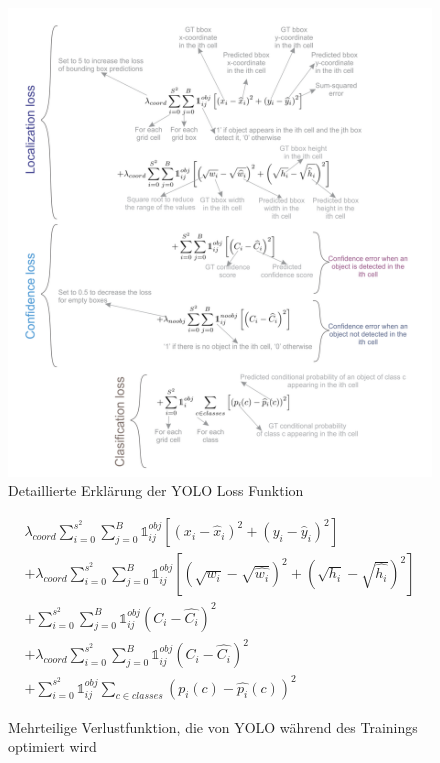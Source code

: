 {    \begin{figure}[h]
		\centering
		\includegraphics*[scale = 0.4, keepaspectratio]{images/YOLO/YOLO_loss_function_detail_expl.png}
		\caption[Detaillierte Erklärung der YOLO Loss Funktion]{Detaillierte Erklärung der YOLO Loss Funktion\citep{Terven2023}}
		\label{YOLO_loss_function_detail}
 	\end{figure}


     \begin{figure}
        \begin{multline}
            \lambda_{coord} \sum_{i=0}^{s^2} \sum_{j=0}^{B} \mathbb{1}_{i j}^{obj}\left[(x_i-\hat{x}_i)^2 + (y_i - \hat{y}_i)^2\right]\\
            + \lambda_{coord} \sum_{i=0}^{s^2} \sum_{j=0}^{B} \mathbb{1}_{i j}^{obj}\left[\left(\sqrt{w_i} - \sqrt{\hat{w_i}}\right)^2 + \left(\sqrt{h_i}-\sqrt{\hat{h_i}}\right)^2\right]\\
            + \sum_{i=0}^{s^2} \sum_{j=0}^{B} \mathbb{1}_{i j}^{obj}\left(C_i - \hat{C_i}\right)^2\\
            + \lambda_{coord} \sum_{i=0}^{s^2} \sum_{j=0}^{B} \mathbb{1}_{i j}^{obj}\left(C_i - \hat{C_i}\right)^2\\
            + \sum_{i=0}^{s^2} \mathbb{1}_{i j}^{obj} \sum_{c \in classes } \left(p_i(c)-\hat{p_i}(c)\right)^2
        \end{multline} 
        \caption{Mehrteilige Verlustfunktion, die von YOLO während des Trainings optimiert wird \citep{Redmon2016}}
        \label{YOLO_Loss_function}
    \end{figure}

}
